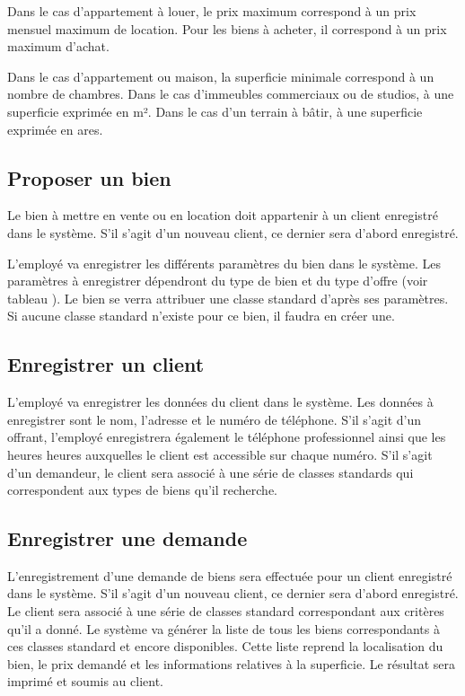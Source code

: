 Dans le cas d'appartement à louer, le prix maximum correspond à un prix mensuel maximum de location. Pour les biens à acheter, il correspond à un prix maximum d'achat.

Dans le cas d'appartement ou maison, la superficie minimale correspond à un nombre de chambres. Dans le cas d'immeubles commerciaux ou de studios, à une superficie exprimée en m². Dans le cas d'un terrain à bâtir, à une superficie exprimée en ares.

\subsection{Proposer un bien}

Le bien à mettre en vente ou en location doit appartenir à un client enregistré dans le système. S'il s'agit d'un nouveau client, ce dernier sera d'abord enregistré.

L'employé va enregistrer les différents paramètres du bien dans le système. Les paramètres à enregistrer dépendront du type de bien et du type d'offre (voir tableau ). Le bien se verra attribuer une classe standard d'après ses paramètres. Si aucune classe standard n'existe pour ce bien, il faudra en créer une.

\subsection{Enregistrer un client}

L'employé va enregistrer les données du client dans le système. Les données à enregistrer sont le nom, l'adresse et le numéro de téléphone. S'il s'agit d'un offrant, l'employé enregistrera également le téléphone professionnel ainsi que les heures heures auxquelles le client est accessible sur chaque numéro. S'il s'agit d'un demandeur, le client sera associé à une série de classes standards qui correspondent aux types de biens qu'il recherche.

\subsection{Enregistrer une demande}

L'enregistrement d'une demande de biens sera effectuée pour un client enregistré dans le système. S'il s'agit d'un nouveau client, ce dernier sera d'abord enregistré. Le client sera associé à une série de classes standard correspondant aux critères qu'il a donné. Le système va générer la liste de tous les biens correspondants à ces classes standard et encore disponibles. Cette liste reprend la localisation du bien, le prix demandé et les informations relatives à la superficie. Le résultat sera imprimé et soumis au client.

